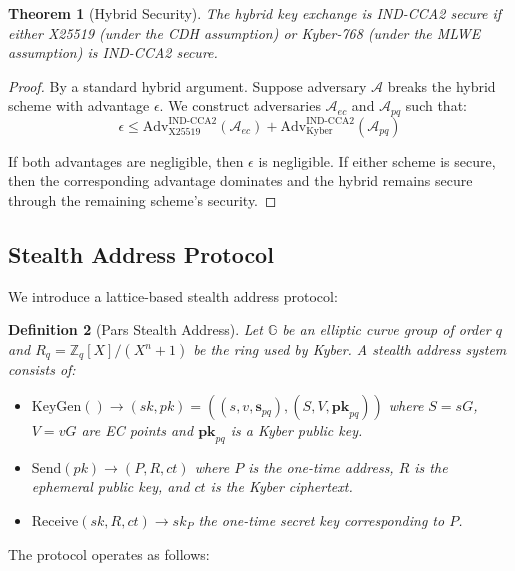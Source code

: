 \documentclass[11pt,a4paper,twocolumn]{article}
\newtheorem{theorem}{Theorem}[section]
\newtheorem{definition}[theorem]{Definition}
\begin{document}
\begin{theorem}[Hybrid Security]
The hybrid key exchange is IND-CCA2 secure if either X25519 (under the CDH assumption) or Kyber-768 (under the MLWE assumption) is IND-CCA2 secure.
\end{theorem}

\begin{proof}
By a standard hybrid argument. Suppose adversary $\mathcal{A}$ breaks the hybrid scheme with advantage $\epsilon$. We construct adversaries $\mathcal{A}_{ec}$ and $\mathcal{A}_{pq}$ such that:
$$\epsilon \leq \text{Adv}^{\text{IND-CCA2}}_{\text{X25519}}(\mathcal{A}_{ec}) + \text{Adv}^{\text{IND-CCA2}}_{\text{Kyber}}(\mathcal{A}_{pq})$$

If both advantages are negligible, then $\epsilon$ is negligible. If either scheme is secure, then the corresponding advantage dominates and the hybrid remains secure through the remaining scheme's security.
\end{proof}

\subsection{Stealth Address Protocol}

We introduce a lattice-based stealth address protocol:

\begin{definition}[Pars Stealth Address]
Let $\mathbb{G}$ be an elliptic curve group of order $q$ and $R_q = \mathbb{Z}_q[X]/(X^n+1)$ be the ring used by Kyber. A stealth address system consists of:
\begin{itemize}
  \item $\text{KeyGen}() \to (sk, pk) = ((s, v, \mathbf{s}_{pq}), (S, V, \mathbf{pk}_{pq}))$ where $S = sG$, $V = vG$ are EC points and $\mathbf{pk}_{pq}$ is a Kyber public key.
  \item $\text{Send}(pk) \to (P, R, ct)$ where $P$ is the one-time address, $R$ is the ephemeral public key, and $ct$ is the Kyber ciphertext.
  \item $\text{Receive}(sk, R, ct) \to sk_P$ the one-time secret key corresponding to $P$.
\end{itemize}
\end{definition}

The protocol operates as follows:
\end{document}

